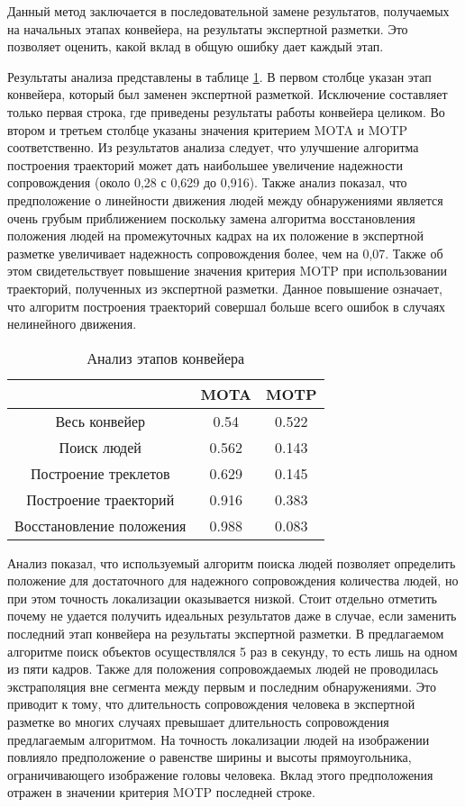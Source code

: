 Данный метод заключается в последовательной замене результатов, получаемых на начальных этапах конвейера, на результаты экспертной разметки. Это позволяет оценить, какой вклад в общую ошибку дает каждый этап.

Результаты анализа представлены в таблице \ref{sec::tracking:tab::ceiling_analysis}. В первом столбце указан этап конвейера, который был заменен экспертной разметкой. Исключение составляет только первая строка, где приведены результаты работы конвейера целиком. Во втором и третьем столбце указаны значения критерием MOTA и MOTP соответственно. Из результатов анализа следует, что улучшение алгоритма построения траекторий может дать наибольшее увеличение надежности сопровождения (около 0,28 с 0,629 до 0,916). Также анализ показал, что предположение о линейности движения людей между обнаружениями является очень грубым приближением поскольку замена алгоритма восстановления положения людей на промежуточных кадрах на их положение в экспертной разметке увеличивает надежность сопровождения более, чем на 0,07. Также об этом свидетельствует повышение значения критерия MOTP при использовании траекторий, полученных из экспертной разметки. Данное повышение означает, что алгоритм построения траекторий совершал больше всего ошибок в случаях нелинейного движения.

\begin{table}[h]
	\caption{Анализ этапов конвейера} \label{sec::tracking:tab::ceiling_analysis} \centering
	\begin{tabular}{|c|c|c|}
		\hline
		 & MOTA & MOTP\\
		\hline \hline
		Весь конвейер & 0.54 & 0.522 \\ \hline
		Поиск людей & 0.562 & 0.143 \\ \hline
		Построение треклетов & 0.629 & 0.145 \\ \hline
		Построение траекторий & 0.916 & 0.383 \\ \hline
		Восстановление положения & 0.988 & 0.083 \\ \hline
	\end{tabular}
\end{table}

Анализ показал, что используемый алгоритм поиска людей позволяет определить положение для достаточного для надежного сопровождения количества людей, но при этом точность локализации оказывается низкой. Стоит отдельно отметить почему не удается получить идеальных результатов даже в случае, если заменить последний этап конвейера на результаты экспертной разметки. В предлагаемом алгоритме поиск объектов осуществлялся 5 раз в секунду, то есть лишь на одном из пяти кадров. Также для положения сопровождаемых людей не проводилась экстраполяция вне сегмента между первым и последним обнаружениями. Это приводит к тому, что длительность сопровождения человека в  экспертной разметке во многих случаях превышает длительность сопровождения предлагаемым алгоритмом. На точность локализации людей на изображении повлияло предположение о равенстве ширины и высоты прямоугольника, ограничивающего изображение головы человека. Вклад этого предположения отражен в значении критерия MOTP последней строке.

